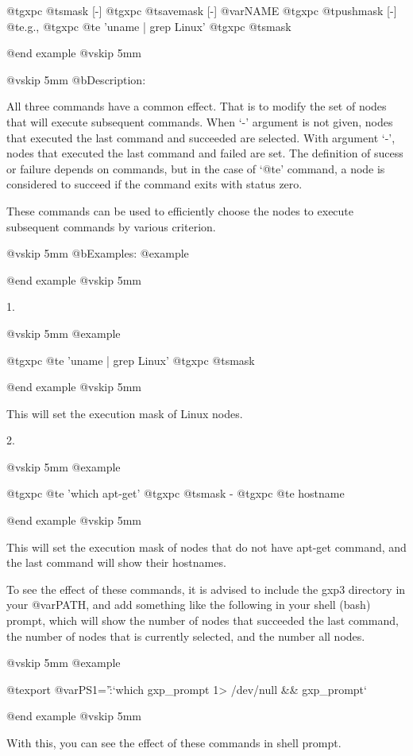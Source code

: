   @t{gxpc} @t{smask}    [-]
  @t{gxpc} @t{savemask} [-] @var{NAME}
  @t{gxpc} @t{pushmask} [-]
  @t{e}.g.,
  @t{gxpc}  @t{e}  'uname | grep Linux'
  @t{gxpc}  @t{smask}

@end example
@vskip 5mm

@vskip 5mm
@b{Description:}


  All three commands have a common effect. That is to modify the
set of nodes that will execute subsequent commands.  When `-'
argument is not given, nodes that executed the last command and
succeeded are selected. With argument `-', nodes that executed
the last command and failed are set. The definition of sucess or
failure depends on commands, but in the case of `@t{e}' command, a
node is considered to succeed if the command exits with status
zero.

These commands can be used to efficiently choose the nodes
to execute subsequent commands by various criterion.

@vskip 5mm
@b{Examples:}
@example


@end example
@vskip 5mm

1.

@vskip 5mm
@example

  @t{gxpc}  @t{e}  'uname | grep Linux'
  @t{gxpc}  @t{smask}

@end example
@vskip 5mm

This will set the execution mask of Linux nodes.

2.

@vskip 5mm
@example

  @t{gxpc}  @t{e}  'which apt-get'
  @t{gxpc}  @t{smask}  -
  @t{gxpc}  @t{e}  hostname

@end example
@vskip 5mm

This will set the execution mask of nodes that do not have apt-get
command, and the last command will show their hostnames.

To see the effect of these commands, it is advised to include the
gxp3 directory in your @var{PATH}, and add something like the following
in your shell (bash) prompt, which will show the number of nodes
that succeeded the last command, the number of nodes that is
currently selected, and the number all nodes.

@vskip 5mm
@example

  @t{export} @var{PS1}='\h:\W`which gxp_prompt 1> /dev/null && gxp_prompt`%

@end example
@vskip 5mm

With this, you can see the effect of these commands in shell
prompt.

